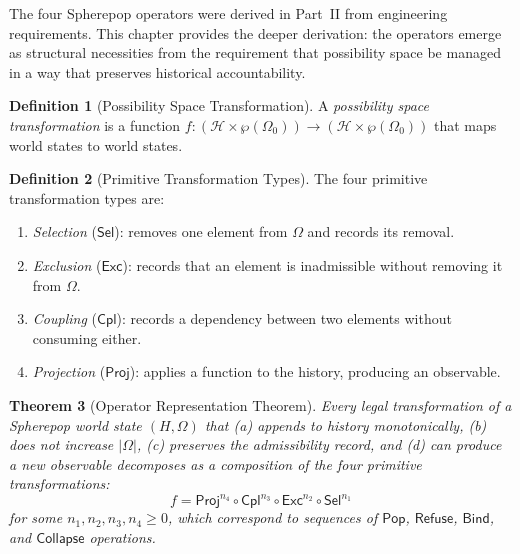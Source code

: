 \documentclass[12pt, a4paper, openany]{book}
\theoremstyle{plain}
\newtheorem{theorem}{Theorem}[chapter]
\theoremstyle{definition}
\newtheorem{definition}[theorem]{Definition}
\theoremstyle{remark}
\newcommand{\Pop}{\mathsf{Pop}}
\newcommand{\Refuse}{\mathsf{Refuse}}
\newcommand{\Bind}{\mathsf{Bind}}
\newcommand{\Collapse}{\mathsf{Collapse}}
\newcommand{\calH}{\mathcal{H}}
\begin{document}
The four Spherepop operators were derived in Part~II from engineering requirements.
This chapter provides the deeper derivation: the operators emerge as structural
necessities from the requirement that possibility space be managed in a way that
preserves historical accountability.

\begin{definition}[Possibility Space Transformation]
A \emph{possibility space transformation} is a function
$f : (\calH \times \wp(\Omega_0)) \to (\calH \times \wp(\Omega_0))$
that maps world states to world states.
\end{definition}

\begin{definition}[Primitive Transformation Types]
The four primitive transformation types are:
\begin{enumerate}
\item \emph{Selection} ($\mathsf{Sel}$): removes one element from $\Omega$ and records its removal.
\item \emph{Exclusion} ($\mathsf{Exc}$): records that an element is inadmissible without removing it from $\Omega$.
\item \emph{Coupling} ($\mathsf{Cpl}$): records a dependency between two elements without consuming either.
\item \emph{Projection} ($\mathsf{Proj}$): applies a function to the history, producing an observable.
\end{enumerate}
\end{definition}

\begin{theorem}[Operator Representation Theorem]
\label{thm:operator-representation}
Every legal transformation of a Spherepop world state $(H, \Omega)$ that
(a) appends to history monotonically, (b) does not increase $|\Omega|$,
(c) preserves the admissibility record, and (d) can produce a new observable
decomposes as a composition of the four primitive transformations:
\[
f = \mathsf{Proj}^{n_4} \circ \mathsf{Cpl}^{n_3} \circ \mathsf{Exc}^{n_2} \circ \mathsf{Sel}^{n_1}
\]
for some $n_1, n_2, n_3, n_4 \geq 0$, which correspond to sequences of
$\Pop$, $\Refuse$, $\Bind$, and $\Collapse$ operations.
\end{theorem}
\end{document}
